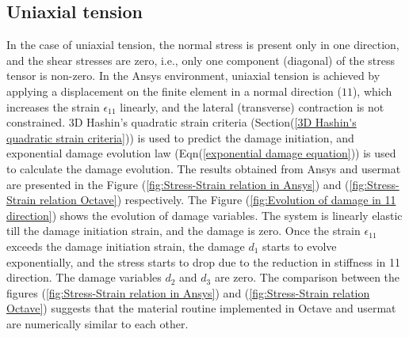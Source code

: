 \documentclass[a4paper,12pt,twoside]{report}
\begin{document}
\subsection{Uniaxial tension}
\indent\indent\indent In the case of uniaxial tension, the normal stress is present only in one direction, and the shear stresses are zero, i.e., only one component (diagonal) of the stress tensor is non-zero.  In the Ansys environment, uniaxial tension is achieved by applying a displacement on the finite element in a normal direction ($11$), which increases the strain $\epsilon_{11}$ linearly, and the lateral (transverse) contraction is not constrained. 3D Hashin's quadratic strain criteria (Section(\ref{3D Hashin's quadratic strain criteria})) is used to predict the damage initiation, and exponential damage evolution law (Eqn(\ref{exponential damage equation})) is used to calculate the damage evolution. The results obtained from Ansys and usermat are presented in the Figure (\ref{fig:Stress-Strain relation in Ansys}) and (\ref{fig:Stress-Strain relation Octave}) respectively. The Figure (\ref{fig:Evolution of damage in 11 direction}) shows the evolution of damage variables.  The system is linearly elastic till the damage initiation strain, and the damage is zero. Once the strain $\epsilon_{11}$ exceeds the damage initiation strain, the damage $d_{1}$ starts to evolve exponentially, and the stress starts to drop due to the reduction in stiffness in 11 direction.  The damage variables $d_{2}$ and $d_{3}$ are zero. The comparison between the figures (\ref{fig:Stress-Strain relation in Ansys}) and (\ref{fig:Stress-Strain relation Octave}) suggests that the material routine implemented in Octave and usermat are numerically similar to each other.
\end{document}
